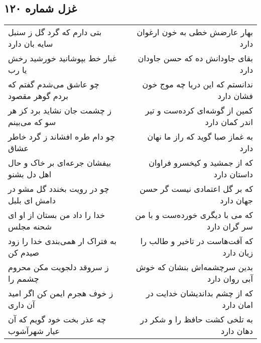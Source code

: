 \begin{center}
\section*{غزل شماره ۱۲۰}
\label{sec:sh120}
\begin{longtable}{l p{0.5cm} r}
بتی دارم که گرد گل ز سنبل سایه بان دارد
&&
بهار عارضش خطی به خون ارغوان دارد
\\
غبار خط بپوشانید خورشید رخش یا رب
&&
بقای جاودانش ده که حسن جاودان دارد
\\
چو عاشق می‌شدم گفتم که بردم گوهر مقصود
&&
ندانستم که این دریا چه موج خون فشان دارد
\\
ز چشمت جان نشاید برد کز هر سو که می‌بینم
&&
کمین از گوشه‌ای کرده‌ست و تیر اندر کمان دارد
\\
چو دام طره افشاند ز گرد خاطر عشاق
&&
به غماز صبا گوید که راز ما نهان دارد
\\
بیفشان جرعه‌ای بر خاک و حال اهل دل بشنو
&&
که از جمشید و کیخسرو فراوان داستان دارد
\\
چو در رویت بخندد گل مشو در دامش ای بلبل
&&
که بر گل اعتمادی نیست گر حسن جهان دارد
\\
خدا را داد من بستان از او ای شحنه مجلس
&&
که می با دیگری خورده‌ست و با من سر گران دارد
\\
به فتراک ار همی‌بندی خدا را زود صیدم کن
&&
که آفت‌هاست در تاخیر و طالب را زیان دارد
\\
ز سروقد دلجویت مکن محروم چشمم را
&&
بدین سرچشمه‌اش بنشان که خوش آبی روان دارد
\\
ز خوف هجرم ایمن کن اگر امید آن داری
&&
که از چشم بداندیشان خدایت در امان دارد
\\
چه عذر بخت خود گویم که آن عیار شهرآشوب
&&
به تلخی کشت حافظ را و شکر در دهان دارد
\\
\end{longtable}
\end{center}
